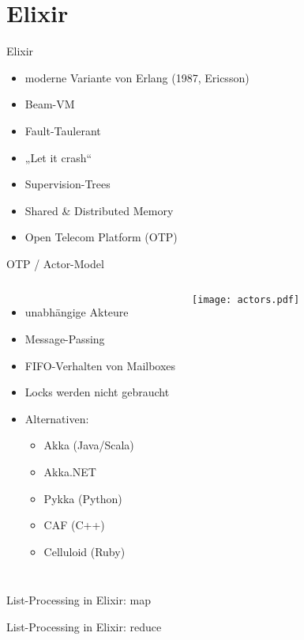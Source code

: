 \documentclass[compress]{beamer}
\begin{document}
\section{Elixir}
  \begin{frame}{Elixir}
    \begin{itemize}
      \item moderne Variante von Erlang (1987, Ericsson)
      \item Beam-VM
      \item Fault-Taulerant
      \item „Let it crash“
      \item Supervision-Trees
      \item Shared \& Distributed Memory
      \item Open Telecom Platform (OTP)
    \end{itemize}
  \end{frame}

  \begin{frame}{OTP / Actor-Model}
    \begin{columns}[c]
    \begin{itemize}
      \item unabhängige Akteure
      \item Message-Passing
      \item FIFO-Verhalten von Mailboxes
      \item Locks werden nicht gebraucht
      \item Alternativen:
        \begin{itemize}
          \item Akka (Java/Scala)
          \item Akka.NET
          \item Pykka (Python)
          \item CAF (C++)
          \item Celluloid (Ruby)
        \end{itemize}
    \end{itemize}
      \texttt{[image: actors.pdf]}
    \end{columns}
  \end{frame}
  
  \begin{frame}{List-Processing in Elixir: map}
  \end{frame}

  \begin{frame}{List-Processing in Elixir: reduce}
  \end{frame}
\end{document}
